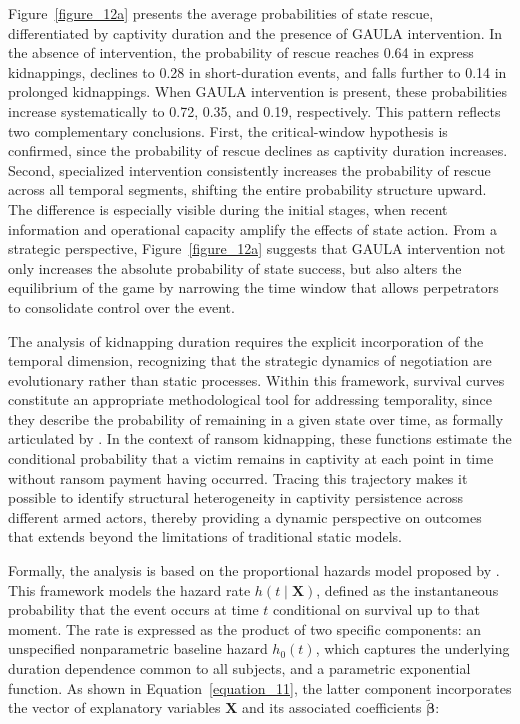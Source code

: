 \documentclass[12pt,a4paper]{article}
\providecommand{\textcite}{\citet}
\theoremstyle{plain}
\theoremstyle{definition}
\theoremstyle{remark}
\newcommand{\1}{\mathbf{1}}
\begin{document}
Figure~\ref{figure_12a} presents the average probabilities of state rescue, differentiated by captivity duration and the presence of GAULA intervention. In the absence of intervention, the probability of rescue reaches 0.64 in express kidnappings, declines to 0.28 in short-duration events, and falls further to 0.14 in prolonged kidnappings. When GAULA intervention is present, these probabilities increase systematically to 0.72, 0.35, and 0.19, respectively. This pattern reflects two complementary conclusions. First, the critical-window hypothesis is confirmed, since the probability of rescue declines as captivity duration increases. Second, specialized intervention consistently increases the probability of rescue across all temporal segments, shifting the entire probability structure upward. The difference is especially visible during the initial stages, when recent information and operational capacity amplify the effects of state action. From a strategic perspective, Figure~\ref{figure_12a} suggests that GAULA intervention not only increases the absolute probability of state success, but also alters the equilibrium of the game by narrowing the time window that allows perpetrators to consolidate control over the event.

The analysis of kidnapping duration requires the explicit incorporation of the temporal dimension, recognizing that the strategic dynamics of negotiation are evolutionary rather than static processes. Within this framework, survival curves constitute an appropriate methodological tool for addressing temporality, since they describe the probability of remaining in a given state over time, as formally articulated by \textcite{Bradburn2003}. In the context of ransom kidnapping, these functions estimate the conditional probability that a victim remains in captivity at each point in time without ransom payment having occurred. Tracing this trajectory makes it possible to identify structural heterogeneity in captivity persistence across different armed actors, thereby providing a dynamic perspective on outcomes that extends beyond the limitations of traditional static models.

Formally, the analysis is based on the proportional hazards model proposed by \textcite{Cox1972}. This framework models the hazard rate \(h(t \mid \mathbf{X})\), defined as the instantaneous probability that the event occurs at time \(t\) conditional on survival up to that moment. The rate is expressed as the product of two specific components: an unspecified nonparametric baseline hazard \(h_0(t)\), which captures the underlying duration dependence common to all subjects, and a parametric exponential function. As shown in Equation~\ref{equation_11}, the latter component incorporates the vector of explanatory variables \(\mathbf{X}\) and its associated coefficients \(\tilde{\boldsymbol{\beta}}\):
\end{document}
